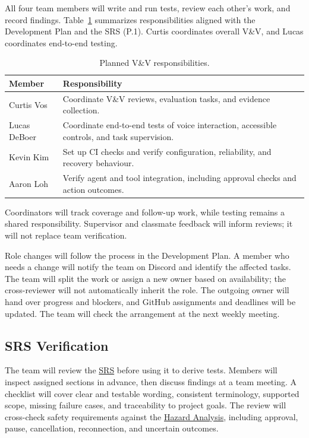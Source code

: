 \documentclass[12pt, titlepage]{article}
\begin{document}
All four team members will write and run tests, review each other's work, and
record findings. Table~\ref{tab:vnv-team} summarizes responsibilities aligned
with the Development Plan and the SRS (P.1). Curtis coordinates overall
V\&V, and Lucas coordinates end-to-end testing.

\begin{table}[htbp]
\centering
\caption{Planned V\&V responsibilities.}
\label{tab:vnv-team}
\begin{tabularx}{\textwidth}{l X}
\toprule
Member & Responsibility\\
\midrule
Curtis Vos & Coordinate V\&V reviews, evaluation tasks, and evidence collection.\\
Lucas DeBoer & Coordinate end-to-end tests of voice interaction, accessible controls, and task supervision.\\
Kevin Kim & Set up CI checks and verify configuration, reliability, and recovery behaviour.\\
Aaron Loh & Verify agent and tool integration, including approval checks and action outcomes.\\
\bottomrule
\end{tabularx}
\end{table}

Coordinators will track coverage and follow-up work, while testing remains a
shared responsibility. Supervisor and classmate feedback will inform reviews;
it will not replace team verification.

Role changes will follow the process in the Development Plan. A member who
needs a change will notify the team on Discord and identify the affected tasks.
The team will split the work or assign a new owner based on availability;
the cross-reviewer will not automatically inherit the role. The outgoing
owner will hand over progress and blockers, and GitHub assignments and
deadlines will be updated. The team will check the arrangement at the next
weekly meeting.

\subsection{SRS Verification}

The team will review the
\href{https://github.com/NaturalControl/natural-control/blob/main/docs/SRS-Meyer/SRS.tex}{SRS}
before using it to derive tests. Members will inspect assigned sections in
advance, then discuss findings at a team meeting. A checklist will cover clear
and testable wording, consistent terminology, supported scope, missing failure
cases, and traceability to project goals. The review will cross-check safety
requirements against the
\href{https://github.com/NaturalControl/natural-control/blob/main/docs/HazardAnalysis/HazardAnalysis.tex}{Hazard Analysis},
including approval, pause, cancellation, reconnection, and uncertain outcomes.
\end{document}

